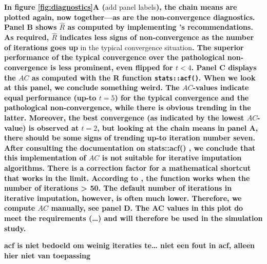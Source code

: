 \documentclass[Royal,times,sageh]{sagej}
\begin{document}
\textbf{In figure \ref{fig:diagnostics}A (}add panel labels\textbf{),
the chain means are plotted again, now together---as are the
non-convergence diagnostics. Panel B shows \(\widehat{R}\) as computed
by implementing \citet{veht19} 's recommendations. As required,
\(\widehat{R}\) indicates less signs of non-convergence as the number of
iterations goes up }in the typical convergence situation\textbf{. The
superior performance of the typical convergence over the pathological
non-convergence is less prominent, even flipped for \(t<4\). Panel C
displays the \(AC\) as computed with the R function
\texttt{stats::acf()}. When we look at this panel, we conclude something
weird. The \(AC\)-values indicate equal performance (up-to \(t=5\)) for
the typical convergence and the pathological non-convergence, while
there is obvious trending in the latter. Moreover, the best convergence
(as indicated by the lowest \(AC\)-value) is observed at \(t=2\), but
looking at the chain means in panel A, there should be some signs of
trending up-to iteration number seven. After consulting the
documentation on stats::acf() \citep{R}, we conclude that this
implementation of \(AC\) is not suitable for iterative imputation
algorithms. There is a correction factor for a mathematical shortcut
that works in the limit. According to \citet{box15}, the function works
when the number of iterations \textgreater{} 50. The default number of
iterations in iterative imputation, however, is often much lower.
Therefore, we compute \(AC\) manually, see panel D. The AC values in
this plot do meet the requirements (\ldots) and will therefore be used
in the simulation study.}

\textbf{acf is niet bedoeld om weinig iteraties te\ldots{} niet een fout
in acf, alleen hier niet van toepassing}
\end{document}

